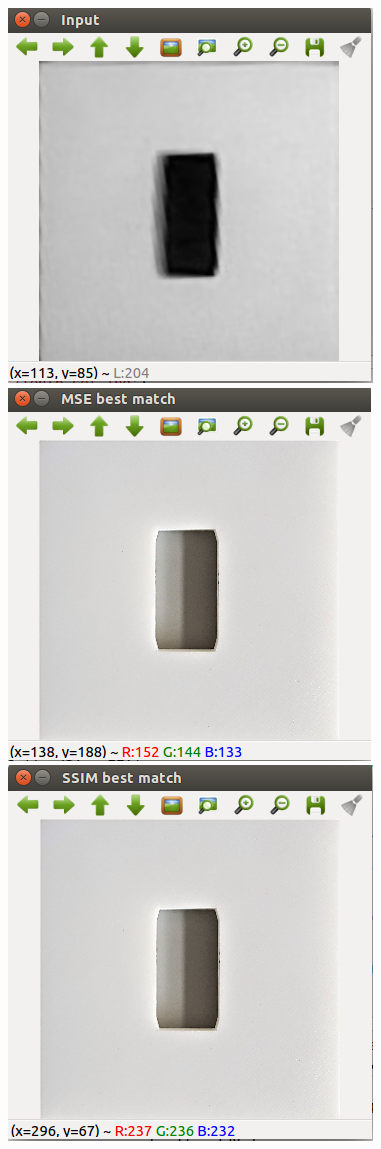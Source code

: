 \documentclass{article}
\begin{document}
\begin{figure}[h!]

\centering 
\includegraphics[scale = 0.3 ]{images/ComparisonInput.png}
\includegraphics[scale = 0.3 ]{images/Comparison_MSE_BestMatch.png}
\includegraphics[scale = 0.3]{images/Comparison_SSIM_BestMatch.png}

\end{figure}
\end{document}
